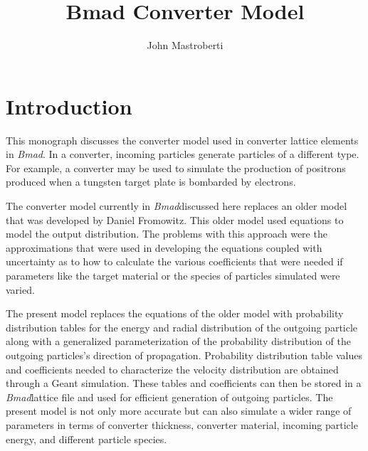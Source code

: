 \documentclass[12pt]{article}
\begin{document}
\title{Bmad Converter Model}
\author{John Mastroberti}

\maketitle

\newcommand{\dxds}{\frac{dx}{ds}}
\newcommand{\dyds}{\frac{dy}{ds}}
\newcommand{\dxdsmin}{\dxds_{\mathrm{min}}}
\newcommand{\dxdsmax}{\dxds_{\mathrm{max}}}
\newcommand{\dydsmax}{\left| \dyds \right|_{\mathrm{max}}}
\newcommand{\exes}{\texttt{converter\_simulation}}
\newcommand{\exef}{\texttt{converter\_fitter}}
\newcommand{\configfile}{\texttt{config.txt}}
\newcommand{\bmad}{\textit{Bmad}}

\tableofcontents

\newpage

\section{Introduction}

This monograph discusses the converter model used in converter lattice elements in \bmad. In a
converter, incoming particles generate particles of a different type. For example, a converter may
be used to simulate the production of positrons produced when a tungsten target plate is bombarded
by electrons.

The converter model currently in \bmad discussed here replaces an older model that was developed by
Daniel Fromowitz\cite{b:fromowitz}. This older model used equations to model the output
distribution.  The problems with this approach were the approximations that were used in developing
the equations coupled with uncertainty as to how to calculate the various coefficients that were
needed if parameters like the target material or the species of particles simulated were varied.

The present model replaces the equations of the older model with probability distribution tables for
the energy and radial distribution of the outgoing particle along with a generalized
parameterization of the probability distribution of the outgoing particles's direction of
propagation.  Probability distribution table values and coefficients needed to characterize the
velocity distribution are obtained through a Geant\cite{geant} simulation. These tables and
coefficients can then be stored in a \bmad lattice file and used for efficient generation of
outgoing particles. The present model is not only more accurate but can also simulate a wider range
of parameters in terms of converter thickness, converter material, incoming particle energy, and
different particle species.
\end{document}
